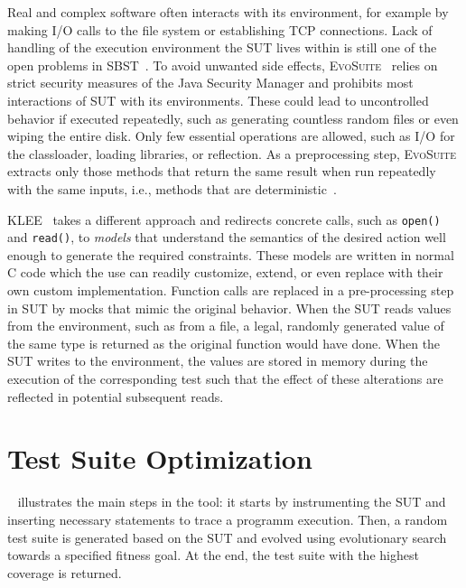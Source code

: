 \documentclass[paper=a4,%
  twoside,%
  BCOR4mm,%
  abstract=true,%
  toc=bibliography,%
  chapterprefix=true,%
  toc=bibliographynumbered,%
  open=right,%
  english,%
  pagesize=pdftex]{scrreprt}
\begin{document}
Real and complex software often interacts with its environment, for example by making I/O calls to the file system or establishing \ac{TCP} connections. Lack of handling of the execution environment the \ac{SUT} lives within is still one of the open problems in \ac{SBST}~\cite{McMinn2011}. To avoid unwanted side effects, \textsc{EvoSuite}~\cite{Fraser2013a} relies on strict security measures of the Java Security Manager and prohibits most interactions of \ac{SUT} with its environments. These could lead to uncontrolled behavior if executed repeatedly, such as generating countless random files or even wiping the entire disk. Only few essential operations are allowed, such as I/O for the classloader, loading libraries, or reflection. As a preprocessing step, \textsc{EvoSuite} extracts only those methods that return the same result when run repeatedly with the same inputs, i.e., methods that are deterministic~\cite{Fraser2012}.

\textsc{KLEE}~\cite{cadar2008klee} takes a different approach and redirects concrete calls, such as \lstinline{open()} and \lstinline{read()}, to \textit{models} that understand the semantics of the desired action well enough to generate the required constraints. These models are written in normal C code which the use can readily customize, extend, or even replace with their own custom implementation. Function calls are replaced in a pre-processing step in \ac{SUT} by mocks that mimic the original behavior. When the \ac{SUT} reads values from the environment, such as from a file, a legal, randomly generated value of the same type is returned as the original function would have done. When the \ac{SUT} writes to the environment, the values are stored in memory during the execution of the corresponding test such that the effect of these alterations are reflected in potential subsequent reads.


\section{Test Suite Optimization}
~ illustrates the main steps in the tool: it starts by instrumenting the \ac{SUT} and inserting necessary statements to trace a programm execution. Then, a random test suite is generated based on the \ac{SUT} and evolved using evolutionary search towards a specified fitness goal. At the end, the test suite with the highest coverage is returned.
\end{document}
